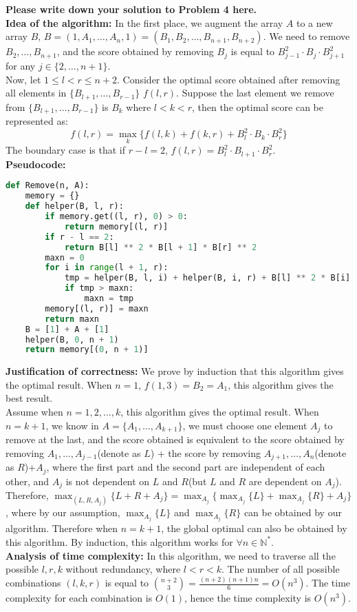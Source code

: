 \documentclass[11pt,twoside]{article}
\newenvironment{solution}{{\par\noindent\it Solution.}}{}
\begin{document}
\begin{solution}
\textbf{Please write down your solution to Problem 4 here.}\\
\textbf{Idea of the algorithm: }In the first place, we augment the array $A$ to a new array $B$, $B=(1, A_1,\dots,A_n,1)=(B_1, B_2,\dots,B_{n+1},B_{n+2})$.
We need to remove $B_2,\dots,B_{n+1}$, and the score obtained by removing $B_j$ is equal to $B_{j-1}^2\cdot B_j\cdot B_{j+1}^2$ for any $j\in\{2,\dots,n+1\}$.
\vspace{5pt}\\
Now, let $1\leq l<r\leq n+2$. Consider the optimal score obtained after removing all elements in $\{B_{l+1},\dots,B_{r-1}\}$ $f(l,r)$. 
Suppose the last element we remove from $\{B_{l+1},\dots,B_{r-1}\}$ is $B_k$ where $l<k<r$, 
then the optimal score can be represented as:
\[f(l,r)=\max_k\{f(l,k)+f(k,r)+B_l^2\cdot B_k\cdot B_r^2\}\]
The boundary case is that if $r-l=2$, $f(l,r)=B_l^2\cdot B_{l+1}\cdot B_r^2$.
\vspace{5pt}\\
\textbf{Pseudocode: }
\begin{lstlisting}[language=Python]
def Remove(n, A):
    memory = {}
    def helper(B, l, r):
        if memory.get((l, r), 0) > 0:
            return memory[(l, r)]
        if r - l == 2:
            return B[l] ** 2 * B[l + 1] * B[r] ** 2
        maxn = 0
        for i in range(l + 1, r):
            tmp = helper(B, l, i) + helper(B, i, r) + B[l] ** 2 * B[i] * B[r] ** 2
            if tmp > maxn:
                maxn = tmp
        memory[(l, r)] = maxn
        return maxn
    B = [1] + A + [1]
    helper(B, 0, n + 1)
    return memory[(0, n + 1)]
\end{lstlisting}
\textbf{Justification of correctness: }We prove by induction that this algorithm gives the optimal result.
When $n=1$, $f(1, 3)=B_2=A_1$, this algorithm gives the best result.
\vspace{5pt}\\
Assume when $n=1,2,\dots,k$, this algorithm gives the optimal result. When $n=k+1$, we know in $A=\{A_1,\dots,A_{k+1}\}$,
we must choose one element $A_j$ to remove at the last, 
and the score obtained is equivalent to the score obtained by removing $A_1,\dots,A_{j-1}$(denote as $L$) + the score by removing $A_{j+1},\dots,A_n$(denote as $R$)+$A_j$,
where the first part and the second part are independent of each other, and $A_j$ is not dependent on $L$ and $R$(but $L$ and $R$ are dependent on $A_j$).
Therefore, $\max_{(L,R,A_j)}\{L+R+A_j\}=\max_{A_j}\{\max_{A_j}\{L\}+\max_{A_j}\{R\}+A_j\}$, 
where by our assumption, $\max_{A_j}\{L\}$ and $\max_{A_j}\{R\}$ can be obtained by our algorithm. 
Therefore when $n=k+1$, the global optimal can also be obtained by this algorithm. By induction, this algorithm works for $\forall n\in \mathbb{N}^{*}$.
\vspace{5pt}\\
\textbf{Analysis of time complexity: }In this algorithm, we need to traverse all the possible $l,r,k$ without redundancy,
where $l<r<k$. The number of all possible combinations $(l,k,r)$ is equal to ${n+2 \choose 3}=\frac{(n+2)(n+1)n}{6}=O(n^3)$.
The time complexity for each combination is $O(1)$, hence the time complexity is $O(n^3)$.
\end{solution}
\end{document}
